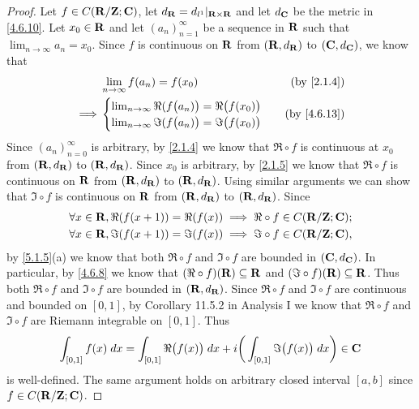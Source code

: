 \begin{proof}
  Let \(f \in C(\mathbf{R} / \mathbf{Z} ; \mathbf{C})\), let \(d_{\mathbf{R}} = d_{l^1}|_{\mathbf{R} \times \mathbf{R}}\) and let \(d_{\mathbf{C}}\) be the metric in \cref{4.6.10}.
  Let \(x_0 \in \mathbf{R}\) and let \((a_n)_{n = 1}^\infty\) be a sequence in \(\mathbf{R}\) such that \(\lim_{n \to \infty} a_n = x_0\).
  Since \(f\) is continuous on \(\mathbf{R}\) from \((\mathbf{R}, d_{\mathbf{R}})\) to \((\mathbf{C}, d_{\mathbf{C}})\), we know that
  \begin{align*}
             & \lim_{n \to \infty} f(a_n) = f(x_0)                                           & \text{(by \cref{2.1.4})} \\
    \implies & \begin{cases}
                 \lim_{n \to \infty} \Re(f\big(a_n)\big) = \Re\big(f(x_0)\big) \\
                 \lim_{n \to \infty} \Im(f\big(a_n)\big) = \Im\big(f(x_0)\big)
               \end{cases} & \text{(by \cref{4.6.13})}
  \end{align*}
  Since \((a_n)_{n = 0}^\infty\) is arbitrary, by \cref{2.1.4} we know that \(\Re \circ f\) is continuous at \(x_0\) from \((\mathbf{R}, d_{\mathbf{R}})\) to \((\mathbf{R}, d_{\mathbf{R}})\).
  Since \(x_0\) is arbitrary, by \cref{2.1.5} we know that \(\Re \circ f\) is continuous on \(\mathbf{R}\) from \((\mathbf{R}, d_{\mathbf{R}})\) to \((\mathbf{R}, d_{\mathbf{R}})\).
  Using similar arguments we can show that \(\Im \circ f\) is continuous on \(\mathbf{R}\) from \((\mathbf{R}, d_{\mathbf{R}})\) to \((\mathbf{R}, d_{\mathbf{R}})\).
  Since
  \begin{align*}
     & \forall x \in \mathbf{R}, \Re(f(x + 1)) = \Re(f(x)) \implies \Re \circ f \in C(\mathbf{R} / \mathbf{Z} ; \mathbf{C}); \\
     & \forall x \in \mathbf{R}, \Im(f(x + 1)) = \Im(f(x)) \implies \Im \circ f \in C(\mathbf{R} / \mathbf{Z} ; \mathbf{C}),
  \end{align*}
  by \cref{5.1.5}(a) we know that both \(\Re \circ f\) and \(\Im \circ f\) are bounded in \((\mathbf{C}, d_{\mathbf{C}})\).
  In particular, by \cref{4.6.8} we know that \((\Re \circ f)(\mathbf{R}) \subseteq \mathbf{R}\) and \((\Im \circ f)(\mathbf{R}) \subseteq \mathbf{R}\).
  Thus both \(\Re \circ f\) and \(\Im \circ f\) are bounded in \((\mathbf{R}, d_{\mathbf{R}})\).
  Since \(\Re \circ f\) and \(\Im \circ f\) are continuous and bounded on \([0, 1]\), by Corollary 11.5.2 in Analysis I we know that \(\Re \circ f\) and \(\Im \circ f\) are Riemann integrable on \([0, 1]\).
  Thus
  \[
    \int_{[0, 1]} f(x) \; dx = \int_{[0, 1]} \Re\big(f(x)\big) \; dx + i \bigg(\int_{[0, 1]} \Im\big(f(x)\big) \; dx\bigg) \in \mathbf{C}
  \]
  is well-defined.
  The same argument holds on arbitrary closed interval \([a, b]\) since \(f \in C(\mathbf{R} / \mathbf{Z} ; \mathbf{C})\).
\end{proof}

